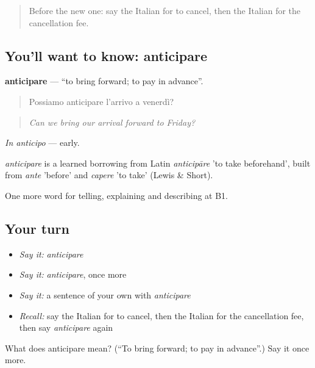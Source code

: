 \label{lesson:IT-C431-anticipare}



\begin{quote}
Before the new one: say the Italian for to cancel, then the Italian for the cancellation fee.
\end{quote}

\subsection*{You'll want to know: anticipare}
\textbf{anticipare} — \textquotedblleft{}to bring forward; to pay in advance\textquotedblright{}.

\begin{quote}
Possiamo anticipare l'arrivo a venerdì?
\end{quote}

\begin{quote}
\emph{Can we bring our arrival forward to Friday?}
\end{quote}

\emph{In anticipo} — early.

\begin{cousinweb}
\emph{anticipare} is a learned borrowing from Latin \emph{anticipāre} 'to take beforehand', built from \emph{ante} 'before' and \emph{capere} 'to take' (Lewis \& Short).
\end{cousinweb}

\begin{grammarlens}[title={What you've built}]
One more word for telling, explaining and describing at B1.
\end{grammarlens}

\subsection*{Your turn}
\begin{itemize}
\raggedright
  \item \emph{Say it:} \emph{anticipare}
  \item \emph{Say it:} \emph{anticipare}, once more
  \item \emph{Say it:} a sentence of your own with \emph{anticipare}
  \item \emph{Recall:} say the Italian for to cancel, then the Italian for the cancellation fee, then say \emph{anticipare} again
\end{itemize}

\begin{tcolorbox}[breakable,colback=teal!4,colframe=teal!35!black,title={Before you move on}]
What does anticipare mean? (\textquotedblleft{}To bring forward; to pay in advance\textquotedblright{}.) Say it once more.
\end{tcolorbox}
